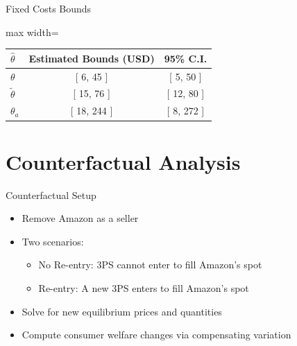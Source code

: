\documentclass[aspectratio=169,professionalfonts]{beamer}
\begin{document}
\begin{frame}{Fixed Costs Bounds}
  \centering
  \begin{adjustbox}{max width=\linewidth}
    {\small
\begin{tabular}{lcc}
  \toprule
  $\hat{\theta}$ & Estimated Bounds (USD) & 95\% C.I.\\
  \midrule
  $\theta$ & [ 6, 45 ] & [ 5, 50 ] \\
  $\tilde{\theta}$ & [ 15, 76 ] & [ 12, 80 ] \\
  $\theta_a$ & [ 18, 244 ] & [ 8, 272 ] \\
  \bottomrule
\end{tabular}
    }
  \end{adjustbox}
\end{frame}

\section{Counterfactual Analysis}

\begin{frame}{Counterfactual Setup}
  \begin{itemize}
    \item Remove Amazon as a seller
    \item Two scenarios:
    \begin{itemize}
      \item No Re-entry: 3PS cannot enter to fill Amazon's spot
      \item Re-entry: A new 3PS enters to fill Amazon's spot
    \end{itemize}
    \item Solve for new equilibrium prices and quantities
    \item Compute consumer welfare changes via compensating variation
  \end{itemize}
\end{frame}
\end{document}
